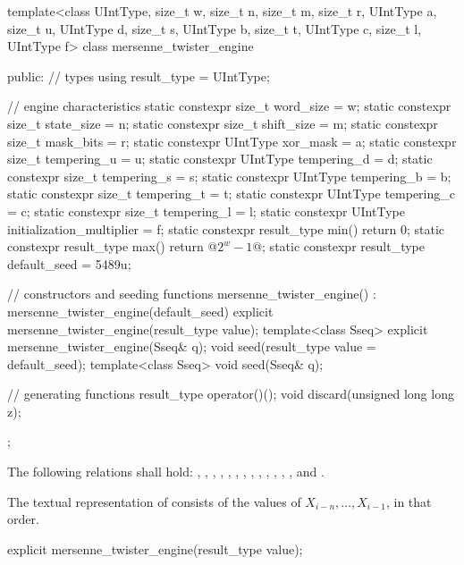 %
%
\begin{codeblock}
template<class UIntType, size_t w, size_t n, size_t m, size_t r,
         UIntType a, size_t u, UIntType d, size_t s,
         UIntType b, size_t t,
         UIntType c, size_t l, UIntType f>
  class mersenne_twister_engine {
  public:
    // types
    using result_type = UIntType;

    // engine characteristics
    static constexpr size_t word_size = w;
    static constexpr size_t state_size = n;
    static constexpr size_t shift_size = m;
    static constexpr size_t mask_bits = r;
    static constexpr UIntType xor_mask = a;
    static constexpr size_t tempering_u = u;
    static constexpr UIntType tempering_d = d;
    static constexpr size_t tempering_s = s;
    static constexpr UIntType tempering_b = b;
    static constexpr size_t tempering_t = t;
    static constexpr UIntType tempering_c = c;
    static constexpr size_t tempering_l = l;
    static constexpr UIntType initialization_multiplier = f;
    static constexpr result_type min() { return 0; }
    static constexpr result_type max() { return  @$2^w - 1$@; }
    static constexpr result_type default_seed = 5489u;

    // constructors and seeding functions
    mersenne_twister_engine() : mersenne_twister_engine(default_seed) {}
    explicit mersenne_twister_engine(result_type value);
    template<class Sseq> explicit mersenne_twister_engine(Sseq& q);
    void seed(result_type value = default_seed);
    template<class Sseq> void seed(Sseq& q);

    // generating functions
    result_type operator()();
    void discard(unsigned long long z);
  };
\end{codeblock}

\pnum
The following relations shall hold:
  ,
  ,
  ,
  ,
  ,
  ,
  ,
  ,
  ,
  ,
  ,
  ,
  ,
and
  .

\pnum
The textual representation%
of 
consists of the values of $X_{i - n}, \dotsc, X_{i - 1}$,
in that order.

\begin{indexed}{}
\begin{itemdecl}
explicit mersenne_twister_engine(result_type value);
\end{itemdecl}
\end{indexed}

